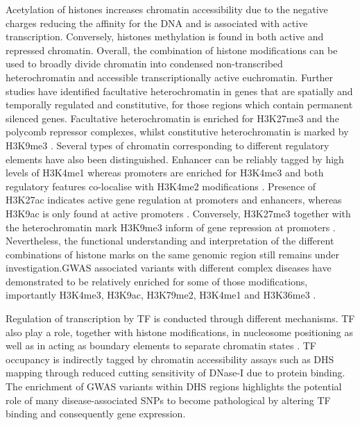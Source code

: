 Acetylation of histones increases chromatin accessibility due to the negative charges reducing the affinity for the DNA and is associated with active transcription. Conversely, histones methylation is found in both active and repressed chromatin. Overall, the combination of histone modifications can be used to broadly divide chromatin into condensed non-transcribed heterochromatin and accessible transcriptionally active euchromatin. Further studies have identified facultative heterochromatin in genes that are spatially and temporally regulated and constitutive, for those regions which contain permanent silenced genes. Facultative heterochromatin is enriched for H3K27me3 and the polycomb repressor complexes, whilst constitutive heterochromatin is marked by H3K9me3 \parencite{Hansen2008,Bannister2001}. Several types of chromatin corresponding to different regulatory elements have also been distinguished. Enhancer can be reliably tagged by high levels of H3K4me1 whereas promoters are enriched for H3K4me3 and both regulatory features co-localise with H3K4me2 modifications \parencite{Heintzman2007,Hon2009}. Presence of H3K27ac indicates active gene regulation at promoters and enhancers, whereas H3K9ac is only found at active promoters \parencite{Hon2009,Creyghton2010}. Conversely, H3K27me3 together with the heterochromatin mark H3K9me3 inform of gene repression at promoters \parencite{Hansen2008,Bannister2001,Pan2007}. Nevertheless, the functional understanding and interpretation of the different combinations of histone marks on the same genomic region still remains under investigation.GWAS associated variants with different complex diseases have demonstrated to be relatively enriched for some of those modifications, importantly H3K4me3, H3K9ac, H3K79me2, H3K4me1 and H3K36me3 \parencite{Ernst2011, Trynka2013}. 

Regulation of transcription by TF is conducted through different mechanisms.
TF also play a role, together with histone modifications, in nucleosome positioning as well as in acting as boundary elements to separate chromatin states \parencite{Vierstra2014,Zhang2009,Bell2000}. TF occupancy is indirectly tagged by chromatin accessibility assays such as DHS mapping through reduced cutting sensitivity of DNase-I due to protein binding. The enrichment of GWAS variants within DHS regions highlights the potential role of many disease-associated SNPs to become pathological by altering TF binding and consequently gene expression.



